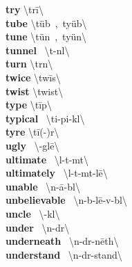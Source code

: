 \documentclass[10pt,a4paper]{article}
\begin{document}
\begin{multicols}{2}
\textbf{ try }\quad \textbackslash \textprimstress tr\={i}\textbackslash \\
\textbf{ tube }\quad \textbackslash \textprimstress t\"{u}b\ ,\ \textprimstress ty\"{u}b\textbackslash \\
\textbf{ tune }\quad \textbackslash \textprimstress t\"{u}n\ ,\ \textprimstress ty\"{u}n\textbackslash \\
\textbf{ tunnel }\quad \ \textbackslash \textprimstress t\textschwa -n\textsuperscript{\textreve}l\textbackslash \\
\textbf{ turn }\quad \textbackslash \textprimstress t\textschwa rn\textbackslash \\
\textbf{ twice }\quad \textbackslash \textprimstress tw\={i}s\textbackslash \\
\textbf{ twist }\quad \textbackslash \textprimstress twist\textbackslash \\
\textbf{ type }\quad \textbackslash \textprimstress t\={i}p\textbackslash \\
\textbf{ typical }\quad \ \textbackslash \textprimstress ti-pi-k\textschwa l\textbackslash \\
\textbf{ tyre }\quad \textbackslash \textprimstress t\={i}(-\textschwa )r\textbackslash \\
\textbf{ ugly }\quad \ \textbackslash \textprimstress \textschwa -gl\={e}\textbackslash \\
\textbf{ ultimate }\quad \ \textbackslash \textprimstress \textschwa l-t\textschwa -m\textschwa t\textbackslash \\
\textbf{ ultimately }\quad \ \textbackslash \textprimstress \textschwa l-t\textschwa -m\textschwa t-l\={e}\textbackslash \\
\textbf{ unable }\quad \ \textbackslash \textsecstress \textschwa n-\textprimstress \={a}-b\textschwa l\textbackslash \\
\textbf{ unbelievable }\quad \ \textbackslash \textsecstress \textschwa n-b\textschwa -\textprimstress l\={e}-v\textschwa -b\textschwa l\textbackslash \\
\textbf{ uncle }\quad \ \textbackslash \textprimstress \textschwa \engma -k\textschwa l\textbackslash \\
\textbf{ under }\quad \ \textbackslash \textprimstress \textschwa n-d\textschwa r\textbackslash \\
\textbf{ underneath }\quad \ \textbackslash \textsecstress \textschwa n-d\textschwa r-\textprimstress n\={e}th\textbackslash \\
\textbf{ understand }\quad \ \textbackslash \textsecstress \textschwa n-d\textschwa r-\textprimstress stand\textbackslash \\

\end{multicols}
\end{document}
